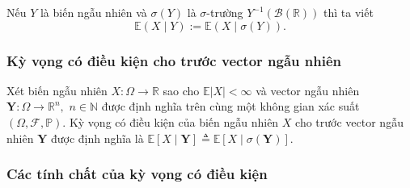 Nếu $Y$ là biến ngẫu nhiên và $\sigma(Y)$ là $\sigma$-trường $Y^{-1}(\mathcal{B}(\mathbb{R}))$ thì ta viết
$$
\mathbb{E}(X \mid Y):=\mathbb{E}(X \mid \sigma(Y)).
$$

\subsubsection{Kỳ vọng có điều kiện cho trước vector ngẫu nhiên}
Xét biến ngẫu nhiên $X: \Omega \rightarrow \mathbb{R}$ sao cho $\mathbb{E}|X|<\infty$ và vector ngẫu nhiên 
$\mathbf{Y}: \Omega \rightarrow \mathbb{R}^{n}, $ $n \in \mathbb{N}$ được định nghĩa trên cùng một không gian xác suất $(\Omega, \mathcal{F}, \mathbb{P})$. Kỳ vọng có điều kiện của biến ngẫu nhiên $X$ cho trước vector ngẫu nhiên $\mathbf{Y}$ được định nghĩa là $\mathbb{E}[X \mid \mathbf{Y}] \triangleq \mathbb{E}[X \mid \sigma(\mathbf{Y})]$.
\subsubsection{Các tính chất của kỳ vọng có điều kiện}

